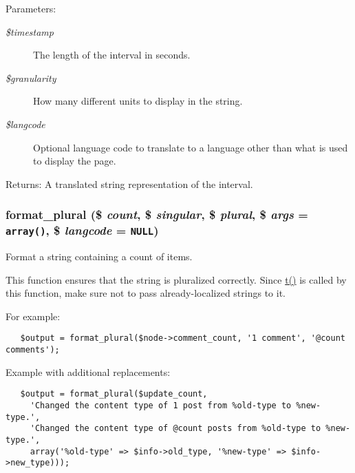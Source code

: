\begin{Desc}
\item[Parameters:]
\begin{description}
\item[{\em \$timestamp}]The length of the interval in seconds. \item[{\em \$granularity}]How many different units to display in the string. \item[{\em \$langcode}]Optional language code to translate to a language other than what is used to display the page. \end{description}
\end{Desc}
\begin{Desc}
\item[Returns:]A translated string representation of the interval. \end{Desc}
\hypertarget{group__format_g0acb4fb7ab13d4b5ca3267a253af2f74}{
\subsubsection[{format\_\-plural}]{\setlength{\rightskip}{0pt plus 5cm}format\_\-plural (\$ {\em count}, \/  \$ {\em singular}, \/  \$ {\em plural}, \/  \$ {\em args} = {\tt array()}, \/  \$ {\em langcode} = {\tt NULL})}}
\label{group__format_g0acb4fb7ab13d4b5ca3267a253af2f74}


Format a string containing a count of items.

This function ensures that the string is pluralized correctly. Since \hyperlink{common_8inc_41d20f0c822bf1f3c26a97981c762665}{t()} is called by this function, make sure not to pass already-localized strings to it.

For example: 

\begin{Code}\begin{verbatim}   $output = format_plural($node->comment_count, '1 comment', '@count comments');
\end{verbatim}
\end{Code}



Example with additional replacements: 

\begin{Code}\begin{verbatim}   $output = format_plural($update_count,
     'Changed the content type of 1 post from %old-type to %new-type.',
     'Changed the content type of @count posts from %old-type to %new-type.',
     array('%old-type' => $info->old_type, '%new-type' => $info->new_type)));
\end{verbatim}
\end{Code}




